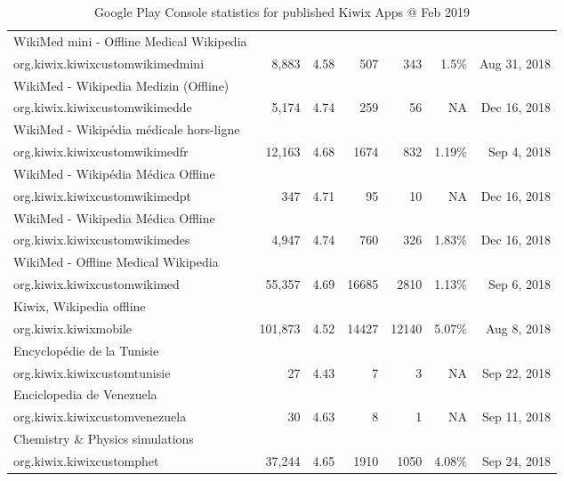 \begin{table}
\begin{tabular}{lrrrrrr}
	WikiMed mini - Offline Medical Wikipedia &  &  &  &  &  &  \\ 
	org.kiwix.kiwixcustomwikimedmini &8,883  & 4.58 & 507 & 343 & 1.5\% &  Aug 31, 2018 \\  
	WikiMed - Wikipedia Medizin (Offline) &  &  &  &  &  &  \\ 
	org.kiwix.kiwixcustomwikimedde &5,174  & 4.74 & 259 & 56 & NA &  Dec 16, 2018 \\ 
	WikiMed - Wikipédia médicale hors-ligne &  &  &  &  &  &  \\ 
	org.kiwix.kiwixcustomwikimedfr &12,163  & 4.68 & 1674 & 832 & 1.19\% &  Sep 4, 2018 \\  
	WikiMed - Wikipédia Médica Offline &  &  &  &  &  &  \\ 
	org.kiwix.kiwixcustomwikimedpt &347  & 4.71 & 95 & 10 & NA & Dec 16, 2018 \\ 
	WikiMed - Wikipedia Médica Offline &  &  &  &  &  &  \\ 
	org.kiwix.kiwixcustomwikimedes &4,947  & 4.74 & 760 & 326 & 1.83\% & Dec 16, 2018 \\
	WikiMed - Offline Medical Wikipedia &  &  &  &  &  &  \\ 
	org.kiwix.kiwixcustomwikimed &55,357  & 4.69 & 16685 & 2810 & 1.13\% & Sep 6, 2018 \\ 
	Kiwix, Wikipedia offline &  &  &  &  &  &  \\ 
	org.kiwix.kiwixmobile &101,873  & 4.52 & 14427 & 12140 & 5.07\% & Aug 8, 2018 \\ 
	Encyclopédie de la Tunisie &  &  &  &  &  &  \\ 
	org.kiwix.kiwixcustomtunisie &27  & 4.43 & 7 & 3 & NA & Sep 22, 2018 \\ 
	Enciclopedia de Venezuela &  &  &  &  &  &  \\ 
	org.kiwix.kiwixcustomvenezuela &30  & 4.63 & 8 & 1 & NA & Sep 11, 2018 \\ 
	Chemistry \& Physics simulations &  &  &  &  &  &  \\ 
	org.kiwix.kiwixcustomphet &37,244  & 4.65 & 1910 & 1050 & 4.08\% & Sep 24, 2018 \\ 

\end{tabular}		
    \caption{Google Play Console statistics for published Kiwix Apps @ Feb 2019}
    \label{tab:gpc_kiwix_apps_11_feb_2019}
\end{table}					

